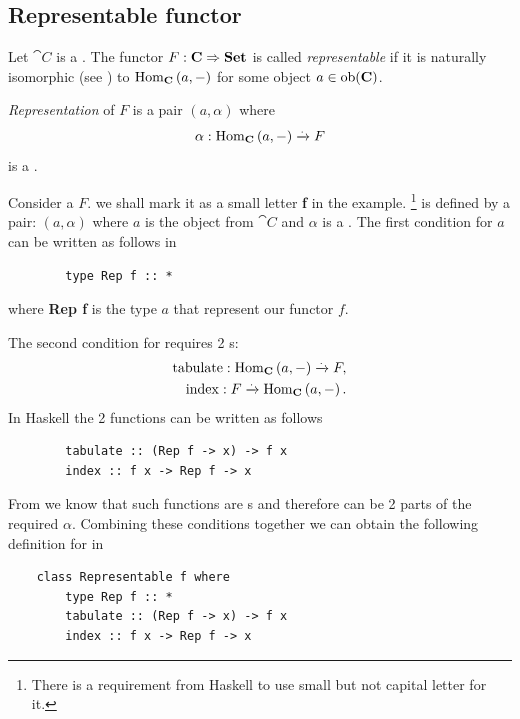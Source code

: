 \subsection{Representable functor}
\begin{definition}
\label{def:representable_functor}
Let $\cat{C}$ is a .
The functor $F: \mathbf{C} \Rightarrow \mathbf{Set}$ is called
\textit{representable} if it is naturally isomorphic (see
) to $\mathrm{Hom}_{\mathbf{C}}\left(a, -\right)$ for some object $a \in
\mathrm{ob}(\mathbf{C})$. 

\textit{Representation} of $F$ is a pair $(a, \alpha)$ where
\[
\alpha: \mathrm{Hom}_{\mathbf{C}}\left(a, -\right) \xrightarrow{.} F
\]
is a .
\end{definition}

\begin{example}
\label{ex:representable_functor_hask}
Consider a  $F$. we shall mark it as a small
letter \textbf{f} in the example. 
\footnote{There is a requirement from Haskell to use small but not
  capital letter for it.}
 is defined by a pair: $(a,
\alpha)$ where $a$ is the object from $\cat{C}$ and $\alpha$ is a
. 
The first condition for $a$ can be written as follows in
\begin{verbatim}
        type Rep f :: *
\end{verbatim} 
where \textbf{Rep f} is the type $a$ that represent our functor $f$. 

The second condition for  requires 2
s: 
\begin{eqnarray}
\mathrm{tabulate} : \mathrm{Hom}_{\mathbf{C}}\left(a, -\right) \xrightarrow{.} F,
\nonumber \\
\mathrm{index} : F \xrightarrow{.} \mathrm{Hom}_{\mathbf{C}}\left(a, -\right).
\nonumber
\end{eqnarray}
In Haskell the 2 functions can be written as follows
\begin{verbatim}
        tabulate :: (Rep f -> x) -> f x
        index :: f x -> Rep f -> x
\end{verbatim} 
From
 we know that such functions are
s and therefore can be 2 parts of the required
 $\alpha$. Combining these conditions together we
can obtain the following definition for  in
\begin{verbatim}
    class Representable f where 
        type Rep f :: *
        tabulate :: (Rep f -> x) -> f x
        index :: f x -> Rep f -> x
\end{verbatim} 


\end{example}
